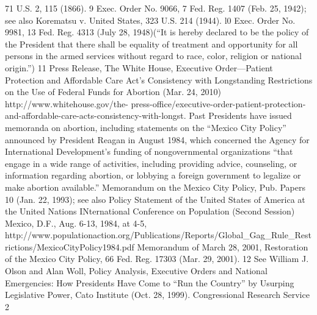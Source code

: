\documentclass[11pt,a4paper]{article}
\begin{document}
71 U.S. 2, 115 (1866). 9 Exec. Order No. 9066, 7 Fed. Reg. 1407 (Feb. 25, 1942); see also Korematsu v. United States, 323 U.S. 214 (1944). l0 Exec. Order No. 9981, 13 Fed. Reg. 4313 (July 28, 1948)(“It is hereby declared to be the policy of the President that there shall be equality of treatment and opportunity for all persons in the armed services without regard to race, color, religion or national origin.”) 11 Press Release, The White House, Executive Order—Patient Protection and Affordable Care Act's Consistency with Longstanding Restrictions on the Use of Federal Funds for Abortion (Mar. 24, 2010) http://www.whitehouse.gov/the- press-office/executive-order-patient-protection-and-affordable-care-acts-consistency-with-longst. Past Presidents have issued memoranda on abortion, including statements on the “Mexico City Policy” announced by President Reagan in August 1984, which concerned the Agency for International Development's funding of nongovernmental organizations “that engage in a wide range of activities, including providing advice, counseling, or information regarding abortion, or lobbying a foreign government to legalize or make abortion available.” Memorandum on the Mexico City Policy, Pub. Papers 10 (Jan. 22, 1993); see also Policy Statement of the United States of America at the United Nations INternational Conference on Population (Second Session) Mexico, D.F., Aug. 6-13, 1984, at 4-5, http://www.populationaction.org/Publications/Reports/Global\_Gag\_Rule\_Restrictions/MexicoCityPolicy1984.pdf Memorandum of March 28, 2001, Restoration of the Mexico City Policy, 66 Fed. Reg. 17303 (Mar. 29, 2001). 12 See William J. Olson and Alan Woll, Policy Analysis, Executive Orders and National Emergencies: How Presidents Have Come to “Run the Country” by Usurping Legislative Power, Cato Institute (Oct. 28, 1999). Congressional Research Service 2
\end{document}
